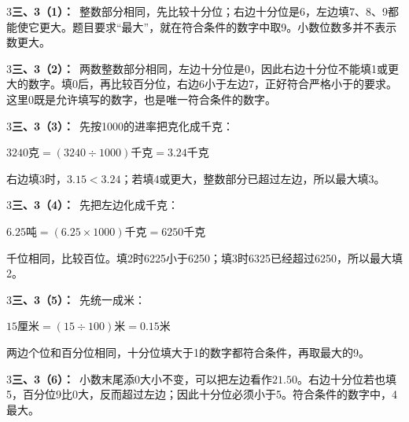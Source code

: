 \documentclass[multi=snippet,border={5bp 20bp 5bp 5bp}]{standalone}
\newenvironment{snippet}[3]{\begin{minipage}{#1bp}\color{answerred}\fontsize{#2}{#3}\selectfont\raggedright}{\end{minipage}}
\begin{document}
\begin{snippet}{505}{11.5}{14}\begin{multicols}{3}\raggedcolumns \textbf{三、3（1）：}\ 整数部分相同，先比较十分位；右边十分位是6，左边填7、8、9都能使它更大。题目要求“最大”，就在符合条件的数字中取9。小数位数多并不表示数更大。\end{multicols}\end{snippet}
\begin{snippet}{505}{11.5}{14}\begin{multicols}{3}\raggedcolumns \textbf{三、3（2）：}\ 两数整数部分相同，左边十分位是0，因此右边十分位不能填1或更大的数字。填0后，再比较百分位，右边6小于左边7，正好符合严格小于的要求。这里0既是允许填写的数字，也是唯一符合条件的数字。\end{multicols}\end{snippet}
\begin{snippet}{505}{11.5}{14}\begin{multicols}{3}\raggedcolumns \textbf{三、3（3）：}\ 先按1000的进率把克化成千克：\par\noindent\(\displaystyle 3240\text{克}=(3240\div1000)\text{千克}=3.24\text{千克}\)\allowbreak \par 右边填3时，\(3.15<3.24\)\allowbreak ；若填4或更大，整数部分已超过左边，所以最大填3。\end{multicols}\end{snippet}
\begin{snippet}{505}{11.5}{14}\begin{multicols}{3}\raggedcolumns \textbf{三、3（4）：}\ 先把左边化成千克：\par\noindent\(\displaystyle 6.25\text{吨}=(6.25\times1000)\text{千克}=6250\text{千克}\)\allowbreak \par 千位相同，比较百位。填2时6225小于6250；填3时6325已经超过6250，所以最大填2。\end{multicols}\end{snippet}
\begin{snippet}{505}{11.5}{14}\begin{multicols}{3}\raggedcolumns \textbf{三、3（5）：}\ 先统一成米：\par\noindent\(\displaystyle 15\text{厘米}=(15\div100)\text{米}=0.15\text{米}\)\allowbreak \par 两边个位和百分位相同，十分位填大于1的数字都符合条件，再取最大的9。\end{multicols}\end{snippet}
\begin{snippet}{505}{11.5}{14}\begin{multicols}{3}\raggedcolumns \textbf{三、3（6）：}\ 小数末尾添0大小不变，可以把左边看作\(21.50\)\allowbreak 。右边十分位若也填5，百分位9比0大，反而超过左边；因此十分位必须小于5。符合条件的数字中，4最大。\end{multicols}\end{snippet}
\end{document}
